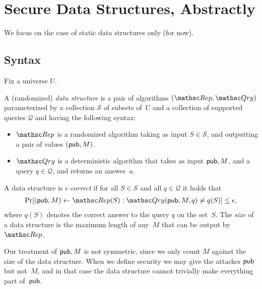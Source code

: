 \section{Secure Data Structures, Abstractly}
We focus on the case of static data structures only (for now).
\def\pub{{\sf pub}}

\subsection{Syntax}
Fix a universe $U$.

\begin{definition}
A (randomized) \emph{data structure} is a pair of algorithms $(\Rep, \Qry)$
parameterized by a collection $\mathcal{S}$ of subsets of~$U$ and a collection
of supported queries $\mathcal{Q}$ and having the following syntax:
\begin{itemize}
\item $\Rep$ is a randomized algorithm taking as input $S \in \mathcal{S}$,
and outputting a pair of values $(\pub, M)$.
\item $\Qry$ is a deterministic algorithm that takes as input $\pub, M$,
and a query $q\in \mathcal{Q}$, and returns an answer~$a$.
\end{itemize}
A data structure is \emph{$\epsilon$-correct} if for all $S \in \mathcal{S}$ and
all $q \in \mathcal{Q}$ it holds that
\begin{eqnarray}
\Pr[(\pub, M) \leftarrow \Rep(S) : \Qry(\pub, M, q) \neq q(S)] \leq \epsilon, \label{eqn:correctness}
\end{eqnarray}
where $q(S)$ denotes the correct answer to the query $q$ on the set~$S$.
The \emph{size} of a data structure is the maximum length of any~$M$ that can be
output by $\Rep$. 
\end{definition}

Our treatment of $\pub, M$ is not symmetric, since we only count $M$ against the size
of the data structure. When we define security
we may give the attacker $\pub$ but not~$M$, and in that case the data structure cannot
trivially make everything part of~$\pub$.  

